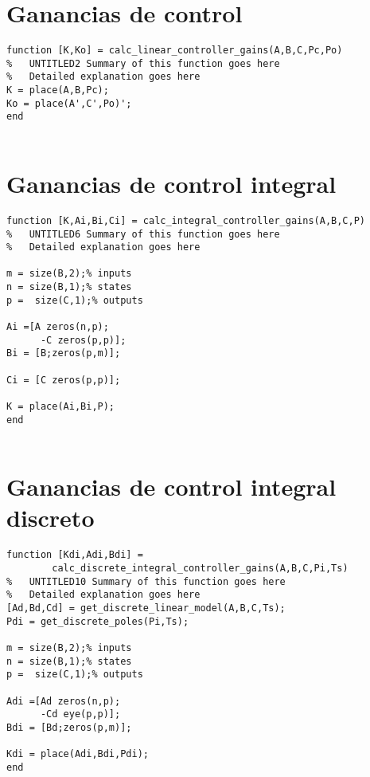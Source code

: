 \section{Ganancias de control} \label{ap:ganancias-control}

\begin{lstlisting}[frame=single]
function [K,Ko] = calc_linear_controller_gains(A,B,C,Pc,Po)
%	UNTITLED2 Summary of this function goes here
%   Detailed explanation goes here
K = place(A,B,Pc);
Ko = place(A',C',Po)';
end


\end{lstlisting}

\section{Ganancias de control integral} \label{ap:ganancias-control-integral}

\begin{lstlisting}[frame=single]
function [K,Ai,Bi,Ci] = calc_integral_controller_gains(A,B,C,P)
%	UNTITLED6 Summary of this function goes here
%   Detailed explanation goes here

m = size(B,2);% inputs
n = size(B,1);% states
p =  size(C,1);% outputs

Ai =[A zeros(n,p);
      -C zeros(p,p)];
Bi = [B;zeros(p,m)];

Ci = [C zeros(p,p)];

K = place(Ai,Bi,P);
end


\end{lstlisting}

\section{Ganancias de control integral discreto}

\begin{lstlisting}[frame=single]
function [Kdi,Adi,Bdi] = 
		calc_discrete_integral_controller_gains(A,B,C,Pi,Ts)
%	UNTITLED10 Summary of this function goes here
%   Detailed explanation goes here
[Ad,Bd,Cd] = get_discrete_linear_model(A,B,C,Ts);
Pdi = get_discrete_poles(Pi,Ts);

m = size(B,2);% inputs
n = size(B,1);% states
p =  size(C,1);% outputs

Adi =[Ad zeros(n,p);
      -Cd eye(p,p)];
Bdi = [Bd;zeros(p,m)];

Kdi = place(Adi,Bdi,Pdi);
end

\end{lstlisting}

